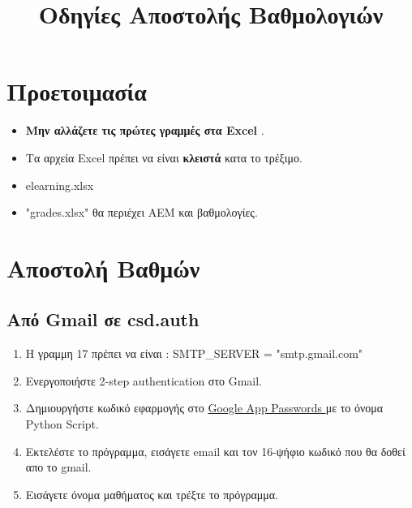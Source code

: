 \documentclass[a4paper,12pt]{article}
\title{Οδηγίες Αποστολής Βαθμολογιών}
\begin{document}
\maketitle

\section{Προετοιμασία}
\begin{itemize}
    \item \textbf{Μην αλλάζετε τις πρώτες γραμμές στα   Excel }.
    \item Τα αρχεία  Excel  πρέπει να είναι \textbf{κλειστά} κατα το τρέξιμο.
    \item {}  elearning.xlsx  
    \item {}"grades.xlsx"  θα περιέχει ΑΕΜ και βαθμολογίες.

\end{itemize}

\section{Αποστολή Βαθμών}
\subsection{Από  Gmail  σε  csd.auth }
\begin{enumerate}
    \item H γραμμη 17 πρέπει να είναι :  SMTP\_SERVER = "smtp.gmail.com"
    \item Ενεργοποιήστε  2-step authentication  στο  Gmail. 
    \item Δημιουργήστε κωδικό εφαρμογής στο \href{https://myaccount.google.com/apppasswords}{ Google App Passwords } με το όνομα Python Script.
    \item Εκτελέστε το πρόγραμμα, εισάγετε  email  και τον 16-ψήφιο κωδικό που θα δοθεί απο το gmail. 
    \item Εισάγετε όνομα μαθήματος και τρέξτε το πρόγραμμα.
\end{enumerate}
\end{document}
